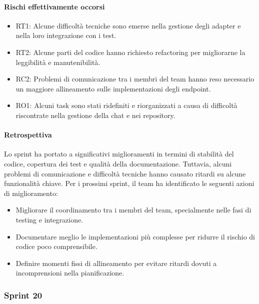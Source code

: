 \documentclass{article}
\begin{document}
            \paragraph{Rischi effettivamente occorsi}
            \begin{itemize}
                \item RT1: Alcune difficoltà tecniche sono emerse nella gestione degli adapter e nella loro integrazione con i test.
                \item RT2: Alcune parti del codice hanno richiesto refactoring per migliorarne la leggibilità e manutenibilità.
                \item RC2: Problemi di comunicazione tra i membri del team hanno reso necessario un maggiore allineamento sulle implementazioni degli endpoint.
                \item RO1: Alcuni task sono stati ridefiniti e riorganizzati a causa di difficoltà riscontrate nella gestione della chat e nei repository.
            \end{itemize}
            
            \paragraph{Retrospettiva}
            Lo sprint ha portato a significativi miglioramenti in termini di stabilità del codice, copertura dei test e qualità della documentazione. Tuttavia, alcuni problemi di comunicazione e difficoltà tecniche hanno causato ritardi su alcune funzionalità chiave. Per i prossimi sprint, il team ha identificato le seguenti azioni di miglioramento:
            \begin{itemize}
                \item Migliorare il coordinamento tra i membri del team, specialmente nelle fasi di testing e integrazione.
                \item Documentare meglio le implementazioni più complesse per ridurre il rischio di codice poco comprensibile.
                \item Definire momenti fissi di allineamento per evitare ritardi dovuti a incomprensioni nella pianificazione.
            \end{itemize}
                
            \subsubsection{Sprint 20}
\end{document}
